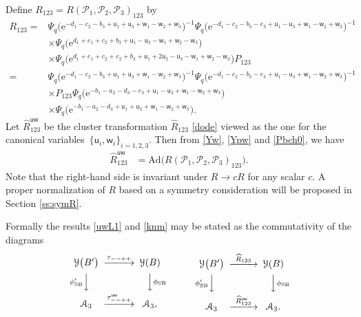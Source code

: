 \documentclass[11pt]{article}
\numberwithin{equation}{section}
\newcommand{\e}{{\mathrm e}}
\newcommand{\uu}{{\mathsf u}}
\newcommand{\ww}{{\mathsf w}}
\numberwithin{equation}{section}
\begin{document}
Define $R_{123}= R(\mathscr{P}_1,\mathscr{P}_2,\mathscr{P}_3)_{123}$ by
\begin{align}
R_{123}
={}&
\Psi_q\bigl(\e^{-d_1-c_2-b_3+\uu_1+\uu_3+\ww_1-\ww_2+\ww_3}\bigr)^{-1}
\Psi_q\bigl(\e^{-d_1-c_2-b_3-e_3+\uu_1-\uu_3+\ww_1-\ww_2+\ww_3}\bigr)^{-1}
\nonumber \\
& \times
\Psi_q\bigl(\e^{d_1+e_1+c_2+b_3+\uu_1-\uu_3-\ww_1+\ww_2-\ww_3}\bigr)\nonumber \\
& \times
\Psi_q\bigl(\e^{d_1+e_1+c_2+e_2+b_3+\uu_1+2\uu_2-\uu_3-\ww_1+\ww_2-\ww_3}\bigr)P_{123}
\label{RL0}
\\
={}&
\Psi_q\bigl(\e^{-d_1-c_2-b_3+\uu_1+\uu_3+\ww_1-\ww_2+\ww_3}\bigr)^{-1}
\Psi_q\bigl(\e^{-d_1-c_2-b_3-e_3+\uu_1-\uu_3+\ww_1-\ww_2+\ww_3}\bigr)^{-1}
\nonumber\\
& \times P_{123}
\Psi_q\bigl(\e^{-b_1-a_2-d_3-e_3+\uu_1-\uu_3+\ww_1-\ww_2+\ww_3}\bigr)\nonumber \\
& \times
\Psi_q\bigl(\e^{-b_1-a_2-d_3+\uu_1+\uu_3+\ww_1-\ww_2+\ww_3}\bigr).
\label{RL1}
\end{align}
Let $\widehat{R}^{\uu\ww}_{123}$ be the cluster transformation $\widehat{R}_{123}$ \eqref{dode}
viewed as the one for the canonical variables~${\{\uu_i, \ww_i\}_{i=1,2,3}}$.
%
Then from \eqref{Yw}, \eqref{Ypw} and \eqref{Pbch0}, we have
\begin{align}\label{knm}
\widehat{R}^{\uu\ww}_{123} &= \mathrm{Ad}\bigl(R(\mathscr{P}_1,\mathscr{P}_2,\mathscr{P}_3)_{123}\bigr).
\end{align}
Note that the right-hand side is invariant under $R \rightarrow cR$ for any scalar $c$.
A proper normalization of $R$ based on a symmetry consideration will be proposed
in Section \ref{ss:symR}.

Formally the results \eqref{uwL1} and \eqref{knm} may be stated as the commutativity of the diagrams
\begin{align*}%
\begin{CD}
\mathcal{Y}\bigl(B'\bigr) @> {\tau_{--++}}>> \mathcal{Y}(B) \\
@V{\phi'_\mathrm{SB}}VV @VV{\phi_\mathrm{SB}}V \\
\mathcal{A}_3 @>{\tau^{\uu\ww}_{--++}}>> \mathcal{A}_3,
\end{CD}
\qquad\qquad
\begin{CD}
\mathcal{Y}\bigl(B'\bigr) @> {\widehat{R}_{123}}>> \mathcal{Y}(B) \\
@V{\phi'_\mathrm{SB}}VV @VV{\phi_\mathrm{SB}}V \\
\mathcal{A}_3 @>{\widehat{R}^{\uu\ww}_{123}}>> \mathcal{A}_3.
\end{CD}
\end{align*}
\end{document}
